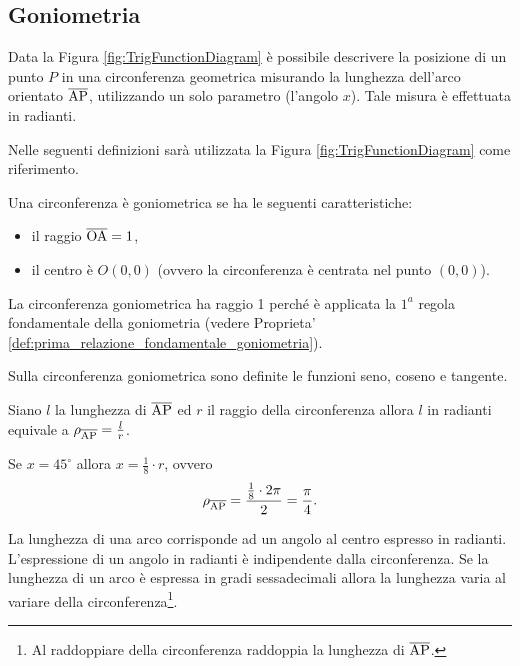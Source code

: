 \subsection{Goniometria}
Data la Figura \ref{fig:TrigFunctionDiagram} è possibile descrivere la posizione di un punto $P$ in una circonferenza geometrica misurando la lunghezza dell'arco orientato $\overline{\rm AP}$, utilizzando un solo parametro (l'angolo $x$). Tale misura è effettuata in \gls{radianti}.

\begin{remark}
    Nelle seguenti definizioni sarà utilizzata la Figura \ref{fig:TrigFunctionDiagram} come riferimento.
\end{remark}

\begin{definition}
    Una circonferenza è goniometrica se ha le seguenti caratteristiche:
    \begin{itemize}
        \item il raggio $\overline{\rm OA}=1$,
        \item il centro è $O(0,0)$ (ovvero la circonferenza è centrata nel punto $(0,0)$).
    \end{itemize}
\end{definition}

La circonferenza goniometrica ha raggio 1 perché è applicata la $1^a$ regola fondamentale della goniometria (vedere Proprieta' \ref{def:prima_relazione_fondamentale_goniometria}).

Sulla circonferenza goniometrica sono definite le funzioni seno, coseno e tangente.

\begin{definition}
    Siano $l$ la lunghezza di $\overline{\rm AP}$ ed $r$ il raggio della circonferenza allora $l$ in radianti equivale a $\rho_{\overline{\rm AP}}=\frac{l}{r}$.
\end{definition}

\begin{example}
    Se $x=45^\circ$ allora $x=\frac{1}{8}\cdot r$, ovvero
    \begin{equation*}
        \rho_{\overline{\rm AP}}=\frac{\frac{1}{8}\cdot 2\pi}{2}=\frac{\pi}{4}.
    \end{equation*}
\end{example}

\begin{remark}
    La lunghezza di una arco corrisponde ad un angolo al centro espresso in radianti. L'espressione di un angolo in radianti è indipendente dalla circonferenza. Se la lunghezza di un arco è espressa in gradi sessadecimali allora la lunghezza varia al variare della circonferenza\footnote{Al raddoppiare della circonferenza raddoppia la lunghezza di $\overline{\rm AP}$.}.
\end{remark}

